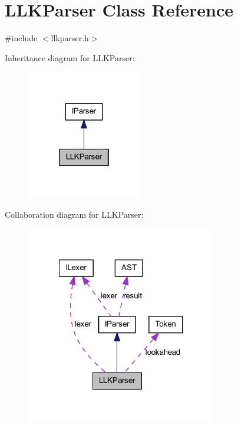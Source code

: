 \hypertarget{class_l_l_k_parser}{
\section{LLKParser Class Reference}
\label{class_l_l_k_parser}
}


{\ttfamily \#include $<$llkparser.h$>$}



Inheritance diagram for LLKParser:
\nopagebreak
\begin{figure}[H]
\begin{center}
\leavevmode
\includegraphics[width=142pt]{class_l_l_k_parser__inherit__graph}
\end{center}
\end{figure}


Collaboration diagram for LLKParser:
\nopagebreak
\begin{figure}[H]
\begin{center}
\leavevmode
\includegraphics[width=236pt]{class_l_l_k_parser__coll__graph}
\end{center}
\end{figure}

